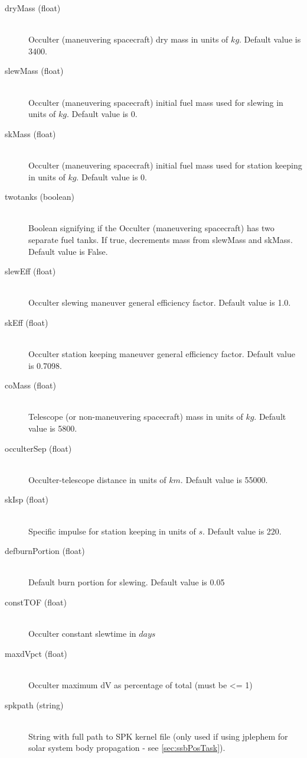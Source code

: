 \documentclass[cleanfoot]{asme2ej}
\begin{document}
\begin{itemize}
\begin{description}
    \item[dryMass (float)] \hfill \\ Occulter (maneuvering spacecraft) dry mass in units of $ kg $. Default value is 3400.
    \item[slewMass (float)] \hfill \\ Occulter (maneuvering spacecraft) initial fuel mass used for slewing in units of $ kg $. Default value is 0.
    \item[skMass (float)] \hfill \\ Occulter (maneuvering spacecraft) initial fuel mass used for station keeping in units of $ kg $. Default value is 0.
    \item[twotanks (boolean)] \hfill \\ Boolean signifying if the Occulter (maneuvering spacecraft) has two separate fuel tanks. If true, decrements mass from slewMass and skMass. Default value is False.
    \item[slewEff (float)] \hfill \\ Occulter slewing maneuver general efficiency factor. Default value is 1.0.
    \item[skEff (float)] \hfill \\ Occulter station keeping maneuver general efficiency factor. Default value is 0.7098.
    \item[coMass (float)] \hfill \\ Telescope (or non-maneuvering spacecraft) mass in units of $ kg $. Default value is 5800.
    \item[occulterSep (float)] \hfill \\ Occulter-telescope distance in units of $ km $. Default value is 55000.
    \item[skIsp (float)] \hfill \\ Specific impulse for station keeping in units of $ s $. Default value is 220.
    \item[defburnPortion (float)] \hfill \\ Default burn portion for slewing. Default value is 0.05
    \item[constTOF (float)] \hfill \\ Occulter constant slewtime in $ days $
    \item[maxdVpct (float)] \hfill \\ Occulter maximum dV as percentage of total (must be <= 1)
    \item[spkpath (string)] \hfill\\ String with full path to SPK kernel file (only used if using jplephem for solar system body propagation - see \ref{sec:ssbPosTask}).

\end{description}
\end{itemize}
\end{document}
